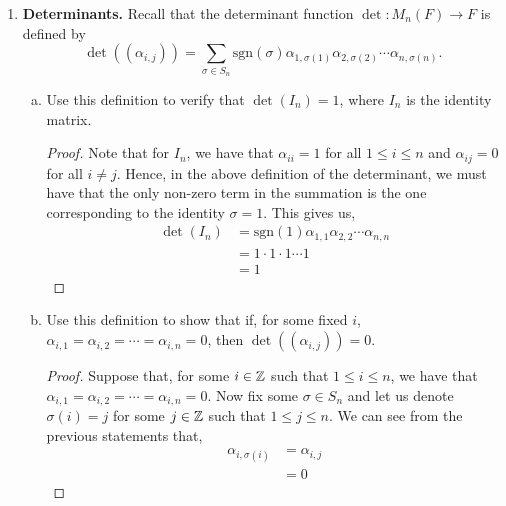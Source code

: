 \documentclass[11pt, reqno]{amsart}
\theoremstyle{plain}
\theoremstyle{definition}
\theoremstyle{example}
\def\<{\langle} \def\>{\rangle}
\def\sgn{\mathrm{sgn}}
\begin{document}
\begin{enumerate}[1.]
\begin{proof}
Fix $A, B \in M_n(F)$. Then we have,
\begin{align*}
\<A, B\> &= tr(AB)\\
&= \sum_{i=1}^n AB_{ii}\\
&= \sum_{i=1}^n \sum_{k=1}^n a_{ik}b_{ki}
\end{align*}

and,
\begin{align*}
\<B, A\> &= tr(BA)\\
&= \sum_{i=1}^n BA_{ii}\\
&= \sum_{i=1}^n \sum_{k=1}^n b_{ik}a_{ki}
\end{align*}


\end{proof}

\item \textbf{Determinants.} Recall that the determinant function $\det : M_n(F) \to F$ is defined by 
$$\det((\alpha_{i,j})) = \sum_{\sigma \in S_n} \sgn(\sigma) \alpha_{1,\sigma(1)}\alpha_{2,\sigma(2)} \cdots \alpha_{n,\sigma(n)}.$$

\begin{enumerate}[(a)]
\item Use this definition to verify that $\det(I_n) = 1$, where $I_n$ is the identity matrix. 
\begin{proof}
Note that for $I_n$, we have that $\alpha_{ii} = 1$ for all $1 \leq i \leq n$ and $\alpha_{ij} = 0$ for all $i \neq j$. Hence, in the above definition of the determinant, we must have that the only non-zero term in the summation is the one corresponding to the identity $\sigma = 1$. This gives us,
\begin{align*}
\det(I_n) &= \sgn(1)\alpha_{1,1}\alpha_{2,2}\cdots\alpha_{n,n}\\
&= 1 \cdot 1 \cdot 1 \cdots 1\\
&= 1
\end{align*}
\end{proof}

\item Use this definition to show that if, for some fixed $i$, $\alpha_{i,1} = \alpha_{i,2} = \cdots = \alpha_{i,n} = 0$, then $\det((\alpha_{i,j})) = 0$. 
\begin{proof}
Suppose that, for some $i \in \mathbb{Z}$ such that $1 \leq i \leq n$, we have that $\alpha_{i,1} = \alpha_{i,2} = \cdots = \alpha_{i,n} = 0$. Now fix some $\sigma \in S_n$ and let us denote $\sigma(i) = j$ for some $j \in \mathbb{Z}$ such that $1 \leq j \leq n$. We can see from the previous statements that,
\begin{align*}
\alpha_{i, \sigma(i)} &= \alpha_{i,j}\\
&= 0
\end{align*}


\end{proof}
\end{enumerate}
\end{enumerate}
\end{document}
